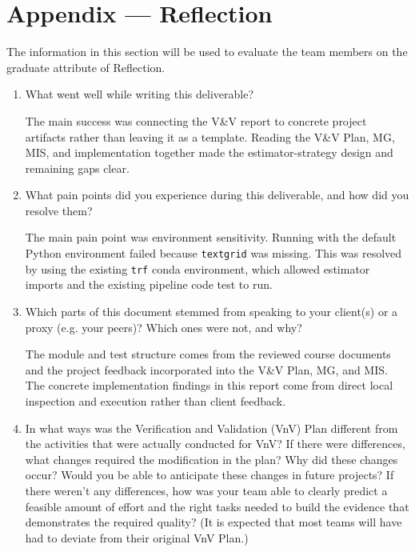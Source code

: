 \documentclass[12pt, titlepage]{article}
\begin{document}



\newpage{}
\section*{Appendix --- Reflection}

The information in this section will be used to evaluate the team members on the graduate attribute of Reflection.



\begin{enumerate}
  \item What went well while writing this deliverable?

  The main success was connecting the V\&V report to concrete project artifacts rather than leaving it as a template. Reading the V\&V Plan, MG, MIS, and implementation together made the estimator-strategy design and remaining gaps clear.

  \item What pain points did you experience during this deliverable, and how did you resolve them?

  The main pain point was environment sensitivity. Running with the default Python environment failed because \texttt{textgrid} was missing. This was resolved by using the existing \texttt{trf} conda environment, which allowed estimator imports and the existing pipeline code test to run.

  \item Which parts of this document stemmed from speaking to your client(s) or a proxy (e.g. your peers)? Which ones were not, and why?

  The module and test structure comes from the reviewed course documents and the project feedback incorporated into the V\&V Plan, MG, and MIS. The concrete implementation findings in this report come from direct local inspection and execution rather than client feedback.

  \item In what ways was the Verification and Validation (VnV) Plan different from the activities that were actually conducted for VnV? If there were differences, what changes required the modification in the plan? Why did these changes occur? Would you be able to anticipate these changes in future projects? If there weren't any differences, how was your team able to clearly predict a feasible amount of effort and the right tasks needed to build the evidence that demonstrates the required quality? (It is expected that most teams will have had to deviate from their original VnV Plan.)


\end{enumerate}
\end{document}
